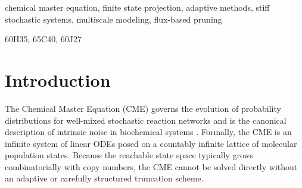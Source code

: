 \documentclass[onefignum,onetabnum]{siamart171218}
\begin{document}
\maketitle

\begin{abstract}
The Finite State Projection (FSP) method approximates the Chemical Master Equation (CME) by restricting the dynamics to a finite subset of the (typically infinite) state space, enabling direct numerical solution with computable error bounds. Adaptive variants update this subset in time, but multiscale systems with widely separated reaction rates remain challenging, as low-probability bottleneck states can carry essential probability flux and the dynamics alternate between fast transients and slowly evolving stiff regimes. We propose a flux-based adaptive FSP method that uses probability flux to drive both state-space pruning and time-step selection. The pruning rule protects low-probability states with large outgoing flux, preserving connectivity in bottleneck systems, while the time-step rule adapts to the instantaneous total flux to handle rate constants spanning several orders of magnitude. Numerical experiments on stiff, oscillatory, and bottleneck reaction networks show that the method maintains accuracy while using substantially smaller state spaces.
\end{abstract}


\begin{keywords}
  chemical master equation, finite state projection, adaptive methods, stiff stochastic systems, multiscale modeling, flux-based pruning
\end{keywords}

\begin{AMS}
  60H35, 65C40, 60J27  
\end{AMS}

\section{Introduction}
The Chemical Master Equation (CME) governs the evolution of probability distributions for well-mixed stochastic reaction networks and is the canonical description of intrinsic noise in biochemical systems \cite{Gillespie1977, Wilkinson2006-so}. 
Formally, the CME is an infinite system of linear ODEs posed on a countably infinite lattice of molecular population states. 
Because the reachable state space typically grows combinatorially with copy numbers, the CME cannot be solved directly without an adaptive or carefully structured truncation scheme.
\end{document}
